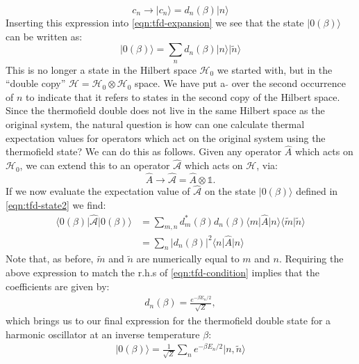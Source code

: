 \documentclass[twocolumn,draft,aps,nofootinbib,nobibnotes,final]{revtex4-2}
\newcommand{\rarrow}{\rightarrow}
\newcommand{\mc}[1]{\mathcal{#1}}
\newcommand{\id}{\mathbb{1}}
\newcommand{\innerp}[2]{\langle #1 \vert #2 \rangle}
\newcommand{\expectop}[3]{\langle #1 \vert #2 \vert #3 \rangle}
\newcommand{\ket}[1]{\vert #1 \rangle}
\begin{document}
\begin{equation}
	c_n \rarrow \ket{c_n} = d_n(\beta) \ket{n} \nonumber
\end{equation}
Inserting this expression into \eqref{eqn:tfd-expansion} we see that the state $ \ket{0(\beta)} $ can be written as:
\begin{equation}\label{eqn:tfd-state2}
	\ket{0(\beta)} = \sum_n d_n(\beta) \ket{n} \ket{\tilde n} \nonumber
\end{equation}
This is no longer a state in the Hilbert space $ \mc H_0 $ we started with, but in the ``double copy'' $ \mc{H} = \mc{H}_0 \otimes \mc{H}_0 $ space. We have put a $ \tilde{} $ over the second occurrence of $ n $ to indicate that it refers to states in the second copy of the Hilbert space.  Since the thermofield double does not live in the same Hilbert space as the original system, the natural question is how can one calculate thermal expectation values for operators which act on the original system using the thermofield state? We can do this as follows. Given any operator $ \hat A $ which acts on $ \mc{H}_0 $, we can extend this to an operator $ \hat {\mc A} $ which acts on $ \mc{H} $, via:
\begin{equation}\label{eqn:operator-extension}
	\hat A \rarrow \hat {\mc A} = \hat A \otimes \id.
\end{equation}
If we now evaluate the expectation value of $ \hat {\mc A} $ on the state $ \ket{0(\beta)} $ defined in \eqref{eqn:tfd-state2} we find:
\begin{align}
	\expectop{0(\beta)}{\hat{\mc A}}{0(\beta)} & = \sum_{m,n} d^*_m(\beta) d_n(\beta)\expectop{m}{\hat A}{n} \innerp{\tilde m}{\tilde n} \nonumber \\
	&= \sum_n |d_n(\beta)|^2 \expectop{n}{\hat A}{n}
\end{align}
Note that, as before, $ \tilde m $ and $ \tilde n $ are numerically equal to $ m $ and $ n $. Requiring the above expression to match the r.h.s of \eqref{eqn:tfd-condition} implies that the coefficients are given by:
\begin{align}
	d_n(\beta) = \frac{e^{-\beta E_n/2}}{\sqrt{Z}}, \nonumber
\end{align}
which brings us to our final expression for the thermofield double state for a harmonic oscillator at an inverse temperature $ \beta $:
\begin{align}
	\ket{0(\beta)} = \frac{1}{\sqrt{Z}} \sum_n  e^{-\beta E_n/2} \ket{n,\tilde n} 
\end{align}
\end{document}
